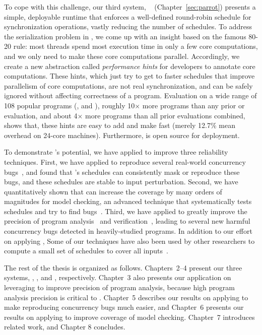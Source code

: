 To cope with this challenge, our third \smt system, \parrot~\cite{parrot:sosp13}
(Chapter~\ref{sec:parrot}) presents a simple, deployable runtime that enforces a
well-defined round-robin schedule for synchronization operations, vastly
reducing the number of schedules. To address the serialization problem in \smt,
we come up with an insight based on the famous 80-20 rule: most threads spend
most execution time in only a few core computations, and we only need to make 
these core computations parallel. Accordingly, we create a new abstraction
called \emph{performance hints} for developers to annotate core computations.
These hints, which just try to get to faster schedules that improve parallelism
of core computations, are not real synchronization, and can be safely ignored
without affecting correctness of a program. Evaluation on a wide range of 108
popular programs (\eg, \bdb and \mplayer), roughly 10$\times$ more programs than
any prior \smt or \dmt evaluation, and about 4$\times$ more programs than all
prior evaluations combined, shows that, these hints are easy to add and make
\parrot fast (merely 12.7\% mean overhead on 24-core machines). Furthermore,
\parrot is open source for deployment.


To demonstrate \smt's potential, we have applied \smt to improve three
reliability techniques. First, we have applied \smt to reproduce several
real-world concurrency bugs~\cite{cui:tern:osdi10}, and found that \smt's
schedules can consistently mask or reproduce these bugs, and these schedules are
stable to input perturbation. Second, we have quantitatively shown that \smt can
increase the coverage by many orders of magnitudes for model checking, an
advanced technique that systematically tests schedules and try to find
bugs~\cite{parrot:sosp13, dbug:spin11, modist:nsdi09}. Third, we have applied
\smt to greatly improve the precision of program analysis~\cite{wu:pldi12} and
verification~\cite{wu:pldi12}, leading to several new harmful concurrency bugs
detected in heavily-studied programs. In addition to our effort on applying
\smt, Some of our \smt techniques have also been used by other researchers to
compute a small set of schedules to cover all inputs~\cite{bergan:oopsla13}.

The rest of the thesis is organized as follows. Chapters~2--4 present our three
\smt systems, \tern, \peregrine, and \tern, respectively. Chapter~3 also
presents our application on leveraging \smt to improve precision of program
analysis, because high program analysis precision is critical to \peregrine.
Chapter~5 describes our results on applying \smt to make reproducing concurrency
bugs much easier, and Chapter~6 presents our results on applying \smt to improve
coverage of model checking. Chapter~7 introduces related work, and Chapter 8
concludes.



